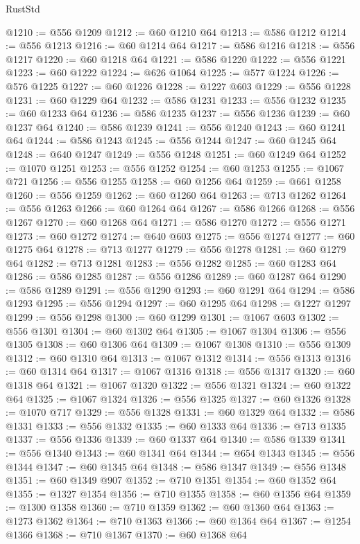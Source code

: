 \begin{lexlean}{RustStd}
\begin{coremodule}
@1210 := @556 @1209
@1212 := @60 @1210 @64
@1213 := @586 @1212
@1214 := @556 @1213
@1216 := @60 @1214 @64
@1217 := @586 @1216
@1218 := @556 @1217
@1220 := @60 @1218 @64
@1221 := @586 @1220
@1222 := @556 @1221
@1223 := @60 @1222
@1224 := @626 @1064
@1225 := @577 @1224
@1226 := @576 @1225
@1227 := @60 @1226
@1228 := @1227 @603
@1229 := @556 @1228
@1231 := @60 @1229 @64
@1232 := @586 @1231
@1233 := @556 @1232
@1235 := @60 @1233 @64
@1236 := @586 @1235
@1237 := @556 @1236
@1239 := @60 @1237 @64
@1240 := @586 @1239
@1241 := @556 @1240
@1243 := @60 @1241 @64
@1244 := @586 @1243
@1245 := @556 @1244
@1247 := @60 @1245 @64
@1248 := @640 @1247
@1249 := @556 @1248
@1251 := @60 @1249 @64
@1252 := @1070 @1251
@1253 := @556 @1252
@1254 := @60 @1253
@1255 := @1067 @721
@1256 := @556 @1255
@1258 := @60 @1256 @64
@1259 := @661 @1258
@1260 := @556 @1259
@1262 := @60 @1260 @64
@1263 := @713 @1262
@1264 := @556 @1263
@1266 := @60 @1264 @64
@1267 := @586 @1266
@1268 := @556 @1267
@1270 := @60 @1268 @64
@1271 := @586 @1270
@1272 := @556 @1271
@1273 := @60 @1272
@1274 := @640 @603
@1275 := @556 @1274
@1277 := @60 @1275 @64
@1278 := @713 @1277
@1279 := @556 @1278
@1281 := @60 @1279 @64
@1282 := @713 @1281
@1283 := @556 @1282
@1285 := @60 @1283 @64
@1286 := @586 @1285
@1287 := @556 @1286
@1289 := @60 @1287 @64
@1290 := @586 @1289
@1291 := @556 @1290
@1293 := @60 @1291 @64
@1294 := @586 @1293
@1295 := @556 @1294
@1297 := @60 @1295 @64
@1298 := @1227 @1297
@1299 := @556 @1298
@1300 := @60 @1299
@1301 := @1067 @603
@1302 := @556 @1301
@1304 := @60 @1302 @64
@1305 := @1067 @1304
@1306 := @556 @1305
@1308 := @60 @1306 @64
@1309 := @1067 @1308
@1310 := @556 @1309
@1312 := @60 @1310 @64
@1313 := @1067 @1312
@1314 := @556 @1313
@1316 := @60 @1314 @64
@1317 := @1067 @1316
@1318 := @556 @1317
@1320 := @60 @1318 @64
@1321 := @1067 @1320
@1322 := @556 @1321
@1324 := @60 @1322 @64
@1325 := @1067 @1324
@1326 := @556 @1325
@1327 := @60 @1326
@1328 := @1070 @717
@1329 := @556 @1328
@1331 := @60 @1329 @64
@1332 := @586 @1331
@1333 := @556 @1332
@1335 := @60 @1333 @64
@1336 := @713 @1335
@1337 := @556 @1336
@1339 := @60 @1337 @64
@1340 := @586 @1339
@1341 := @556 @1340
@1343 := @60 @1341 @64
@1344 := @654 @1343
@1345 := @556 @1344
@1347 := @60 @1345 @64
@1348 := @586 @1347
@1349 := @556 @1348
@1351 := @60 @1349 @907
@1352 := @710 @1351
@1354 := @60 @1352 @64
@1355 := @1327 @1354
@1356 := @710 @1355
@1358 := @60 @1356 @64
@1359 := @1300 @1358
@1360 := @710 @1359
@1362 := @60 @1360 @64
@1363 := @1273 @1362
@1364 := @710 @1363
@1366 := @60 @1364 @64
@1367 := @1254 @1366
@1368 := @710 @1367
@1370 := @60 @1368 @64

\end{coremodule}
\end{lexlean}
